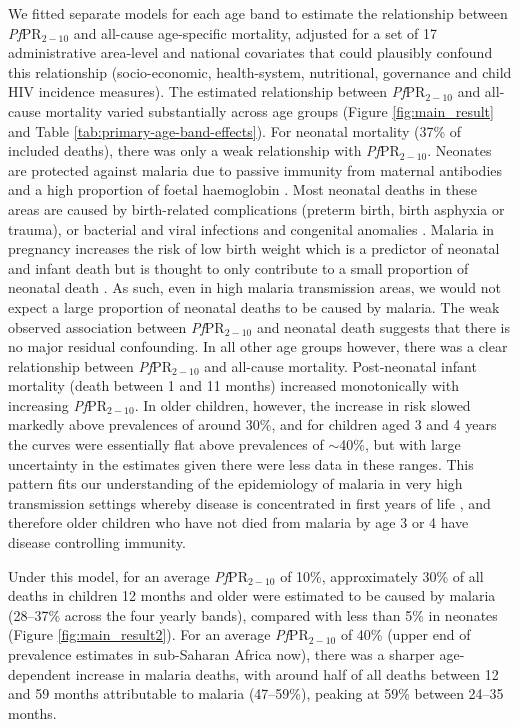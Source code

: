 \documentclass[12pt]{article}
\begin{document}
We fitted separate models for each age band to estimate the relationship between \textit{Pf}PR$_{2-10}$ and all-cause age-specific mortality, adjusted for a set of 17 administrative area-level and national covariates that could plausibly confound this relationship (socio-economic, health-system, nutritional, governance and child HIV incidence measures). The estimated relationship between \textit{Pf}PR$_{2-10}$ and all-cause mortality varied substantially across age groups (Figure \ref{fig:main_result} and Table \ref{tab:primary-age-band-effects}). For neonatal mortality (37\% of included deaths), there was only a weak relationship with \textit{Pf}PR$_{2-10}$. Neonates are protected against malaria due to passive immunity from maternal antibodies and a high proportion of foetal haemoglobin \cite{WHO:14}. Most neonatal deaths in these areas are caused by birth-related complications (preterm birth, birth asphyxia or trauma), or bacterial and viral infections and congenital anomalies \cite{who_newborn_mortality_2024}. Malaria in pregnancy increases the risk of low birth weight which is a predictor of neonatal and infant death but is thought to only contribute to a small proportion of neonatal death \cite{Walker:14}. As such, even in high malaria transmission areas, we would not expect a large proportion of neonatal deaths to be caused by malaria. The weak observed association between \textit{Pf}PR$_{2-10}$ and neonatal death suggests that there is no major residual confounding. In all other age groups however, there was a clear relationship between \textit{Pf}PR$_{2-10}$ and all-cause mortality. Post-neonatal infant mortality (death between 1 and 11 months) increased monotonically with increasing \textit{Pf}PR$_{2-10}$. 
In older children, however, the increase in risk slowed markedly above prevalences of around 30\%, and for children aged 3 and 4 years the curves were essentially flat above prevalences of $\sim$40\%, but with large uncertainty in the estimates given there were less data in these ranges. This pattern fits our understanding of the epidemiology of malaria in very high transmission settings whereby disease is concentrated in first years of life \cite{Kamau:22}, and therefore older children who have not died from malaria by age 3 or 4 have disease controlling immunity.

Under this model, for an average \textit{Pf}PR$_{2-10}$ of 10\%, approximately 30\% of all deaths in children 12 months and older were estimated to be caused by malaria (28–37\% across the four yearly bands), compared with less than 5\% in neonates (Figure \ref{fig:main_result2}). For an average \textit{Pf}PR$_{2-10}$ of 40\% (upper end of prevalence estimates in sub-Saharan Africa now), there was a sharper age-dependent increase in malaria deaths, with around half of all deaths between 12 and 59 months attributable to malaria (47–59\%), peaking at 59\% between 24–35 months.
\end{document}
